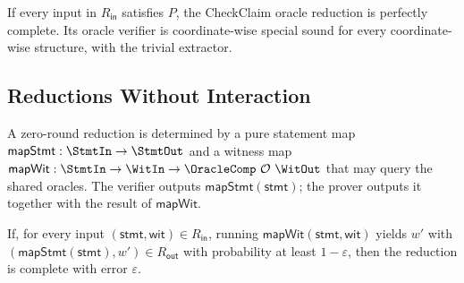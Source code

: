 \begin{theorem}
    If every input in $R_{\mathsf{in}}$ satisfies $P$, the CheckClaim oracle reduction is perfectly complete. Its oracle verifier is coordinate-wise special sound for every coordinate-wise structure, with the trivial extractor.
    \leanok
\end{theorem}

\subsection{Reductions Without Interaction}

\begin{definition}
    \label{def:no_interaction_reduction}
    A zero-round reduction is determined by a pure statement map $\mathsf{mapStmt} : \StmtIn \to \StmtOut$ and a witness map $\mathsf{mapWit} : \StmtIn \to \WitIn \to \OracleComp\ \mathcal{O}\ \WitOut$ that may query the shared oracles. The verifier outputs $\mathsf{mapStmt}(\mathsf{stmt})$; the prover outputs it together with the result of $\mathsf{mapWit}$.
    \leanok
\end{definition}

\begin{theorem}
    If, for every input $(\mathsf{stmt}, \mathsf{wit}) \in R_{\mathsf{in}}$, running $\mathsf{mapWit}(\mathsf{stmt}, \mathsf{wit})$ yields $w'$ with $(\mathsf{mapStmt}(\mathsf{stmt}), w') \in R_{\mathsf{out}}$ with probability at least $1 - \varepsilon$, then the reduction is complete with error $\varepsilon$.
    \leanok
\end{theorem}
